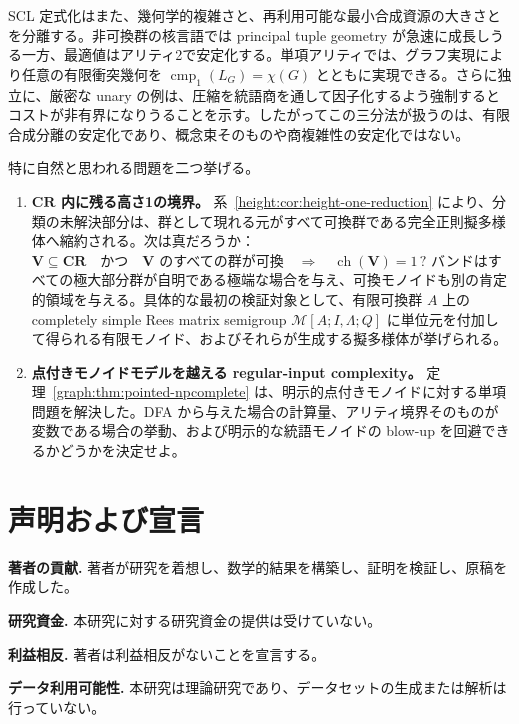\documentclass[10pt,a4paper]{ltjsarticle}
\theoremstyle{definition}
\theoremstyle{remark}
\newcommand{\cmp}{\operatorname{cmp}}
\begin{document}
SCL 定式化はまた、幾何学的複雑さと、再利用可能な最小合成資源の大きさとを分離する。非可換群の核言語では principal tuple geometry が急速に成長しうる一方、最適値はアリティ2で安定化する。単項アリティでは、グラフ実現により任意の有限衝突幾何を
\(\cmp_1(L_G)=\chi(G)\)
とともに実現できる。さらに独立に、厳密な unary の例は、圧縮を統語商を通して因子化するよう強制するとコストが非有界になりうることを示す。したがってこの三分法が扱うのは、有限合成分離の安定化であり、概念束そのものや商複雑性の安定化ではない。

特に自然と思われる問題を二つ挙げる。
\begin{enumerate}[leftmargin=*]
\item \textbf{\(\mathbf{CR}\) 内に残る高さ1の境界。}
系~\ref{height:cor:height-one-reduction} により、分類の未解決部分は、群として現れる元がすべて可換群である完全正則擬多様体へ縮約される。次は真だろうか：
\(
\mathbf V\subseteq\mathbf{CR}
\quad\text{かつ}\quad
\mathbf V\text{ のすべての群が可換}
\quad\Longrightarrow\quad
\operatorname{ch}(\mathbf V)=1\,?
\)
バンドはすべての極大部分群が自明である極端な場合を与え、可換モノイドも別の肯定的領域を与える。具体的な最初の検証対象として、有限可換群 \(A\) 上の completely simple Rees matrix semigroup
\(\mathcal M[A;I,\Lambda;Q]\)
に単位元を付加して得られる有限モノイド、およびそれらが生成する擬多様体が挙げられる。

\item \textbf{点付きモノイドモデルを越える regular-input complexity。}
定理~\ref{graph:thm:pointed-npcomplete} は、明示的点付きモノイドに対する単項問題を解決した。DFA から与えた場合の計算量、アリティ境界そのものが変数である場合の挙動、および明示的な統語モノイドの blow-up を回避できるかどうかを決定せよ。

\end{enumerate}

\section*{声明および宣言}

\noindent\textbf{著者の貢献.}
著者が研究を着想し、数学的結果を構築し、証明を検証し、原稿を作成した。

\noindent\textbf{研究資金.}
本研究に対する研究資金の提供は受けていない。

\noindent\textbf{利益相反.}
著者は利益相反がないことを宣言する。

\noindent\textbf{データ利用可能性.}
本研究は理論研究であり、データセットの生成または解析は行っていない。
\end{document}

